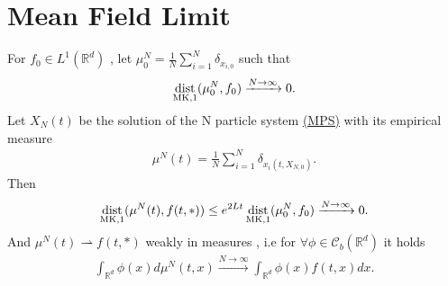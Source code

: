 \section{Mean Field Limit}
\begin{theorem}\label{mean_field_limit}
  For $f_{0} \in  L^{1}(\mathbb{R}^{d} ) $ , let $\mu_0^{N} = \frac{1}{N} \sum_{i=1}^{N} \delta_{x_{i,0}} $  such that
  \begin{align*}
    \operatorname*{dist}_{\text{MK},1}(\mu_0^{N},f_{0} ) \xrightarrow{N\to \infty} 0
  .\end{align*}
  Let $X_N(t)$ be the solution of the N particle system \hyperref[first_order_system]{(MPS)} with its empirical measure   
  \begin{align*}
    \mu ^{N}(t) = \frac{1}{N}  \sum_{i=1}^{N}  \delta_{x_i(t,X_{N,0})}
  .\end{align*}
  Then 
  \begin{align*}
    \operatorname*{dist}_{\text{MK},1}(\mu ^{N}(t),f(t,*) ) \le e^{2Lt} \operatorname*{dist}_{\text{MK},1}(\mu_0^{N},f_{0} ) \xrightarrow{N \to \infty} 0
  .\end{align*}
  And $\mu ^{N}(t) \rightharpoonup f(t,*) $ weakly in measures , i.e for $\forall  \phi  \in  \mathcal{C}_b(\mathbb{R}^{d} )$ it holds 
  \begin{align*}
    \int_{\mathbb{R}^{d} }\phi(x)d\mu ^{N}(t,x) \xrightarrow{N\to \infty}  \int_{\mathbb{R}^{d} } \phi(x)f(t,x) dx 
  .\end{align*}
\end{theorem}
